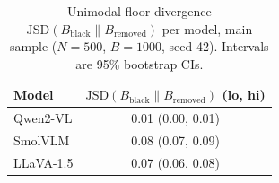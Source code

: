 \begin{table}[t]
\centering
\caption{Unimodal floor divergence $\text{JSD}(B_{\text{black}} \parallel B_{\text{removed}})$
  per model, main sample ($N=500$, $B=1000$, seed 42).
  Intervals are 95\% bootstrap CIs.}
\label{tab:nullsens-floor}
{\footnotesize\setlength{\tabcolsep}{3pt}%
\begin{tabular}{lc}
\toprule
\textbf{Model} & $\text{JSD}(B_{\text{black}} \parallel B_{\text{removed}})$ (lo, hi) \\
\midrule
Qwen2-VL  & 0.01 (0.00, 0.01) \\
SmolVLM   & 0.08 (0.07, 0.09) \\
LLaVA-1.5 & 0.07 (0.06, 0.08) \\
\bottomrule
\end{tabular}}
\end{table}
